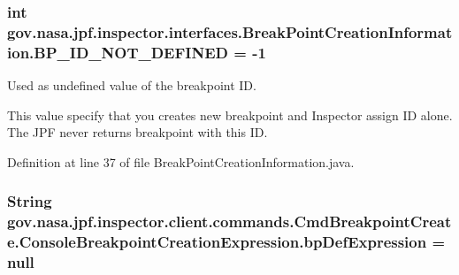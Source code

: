 \subsubsection[{\texorpdfstring{B\+P\+\_\+\+I\+D\+\_\+\+N\+O\+T\+\_\+\+D\+E\+F\+I\+N\+ED}{BP_ID_NOT_DEFINED}}]{\setlength{\rightskip}{0pt plus 5cm}int gov.\+nasa.\+jpf.\+inspector.\+interfaces.\+Break\+Point\+Creation\+Information.\+B\+P\+\_\+\+I\+D\+\_\+\+N\+O\+T\+\_\+\+D\+E\+F\+I\+N\+ED = -\/1\hspace{0.3cm}{\ttfamily [inherited]}}\hypertarget{interfacegov_1_1nasa_1_1jpf_1_1inspector_1_1interfaces_1_1_break_point_creation_information_a24626231e3744e59f505d0731d4ca9e1}{}\label{interfacegov_1_1nasa_1_1jpf_1_1inspector_1_1interfaces_1_1_break_point_creation_information_a24626231e3744e59f505d0731d4ca9e1}


Used as undefined value of the breakpoint ID. 

This value specify that you creates new breakpoint and Inspector assign ID alone. The J\+PF never returns breakpoint with this ID. 

Definition at line 37 of file Break\+Point\+Creation\+Information.\+java.

\subsubsection[{\texorpdfstring{bp\+Def\+Expression}{bpDefExpression}}]{\setlength{\rightskip}{0pt plus 5cm}String gov.\+nasa.\+jpf.\+inspector.\+client.\+commands.\+Cmd\+Breakpoint\+Create.\+Console\+Breakpoint\+Creation\+Expression.\+bp\+Def\+Expression = null\hspace{0.3cm}{\ttfamily [private]}}\hypertarget{classgov_1_1nasa_1_1jpf_1_1inspector_1_1client_1_1commands_1_1_cmd_breakpoint_create_1_1_console_breakpoint_creation_expression_a86a25e4d44f0ec17813cfc1a31c9d5b0}{}\label{classgov_1_1nasa_1_1jpf_1_1inspector_1_1client_1_1commands_1_1_cmd_breakpoint_create_1_1_console_breakpoint_creation_expression_a86a25e4d44f0ec17813cfc1a31c9d5b0}


